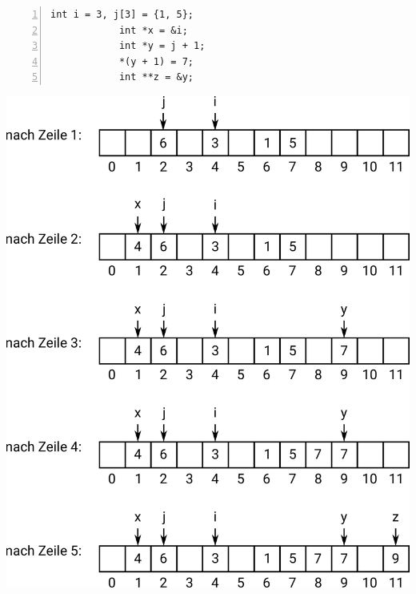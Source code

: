 \documentclass[]{article}
\begin{document}
	\begin{minipage}[t][][b]{0.3\linewidth}
		\begin{lstlisting}[gobble=6,numbers=left]
			int i = 3, j[3] = {1, 5};
			int *x = &i;
			int *y = j + 1;
			*(y + 1) = 7;
			int **z = &y;
		\end{lstlisting}
	\end{minipage}	
	\qquad
	\begin{minipage}[t][][b]{0.65\linewidth}
		\begin{center}
			\includegraphics[width=\linewidth]{figures/memory-solution}		
		\end{center}
	\end{minipage}
	
\end{document}
